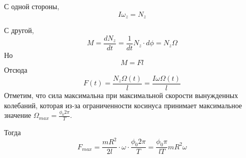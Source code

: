 \documentclass[a5paper,10pt]{article}
\begin{document}
С одной стороны, 
\begin{equation}
	I\omega_z={N}_z
\end{equation}

С другой,
\begin{equation}
	{M}=\frac{d{N_z}}{dt}=\frac{1}{dt}{N_z}\cdot d\phi ={N_z}\Omega
\end{equation}
Но
\begin{equation}
	M=Fl
\end{equation}
Отсюда
\begin{equation}
	F(t)=\frac{N_z\Omega(t)}{l}=\frac{I\omega\Omega(t)}{l}
\end{equation}
Отметим, что сила максимальна при максимальной скорости вынужденных колебаний, которая из-за ограниченности косинуса принимает максимальное значение $\Omega_{max}=\frac{\phi_0 2\pi}{T}$.

Тогда
\begin{equation}
	F_{max}=
	\frac{mR^2}{2l}\cdot\omega\cdot\frac{\phi_0 2\pi}{T}=
	\frac{\phi_0 \pi}{lT}mR^2\omega
\end{equation}
\end{document}
